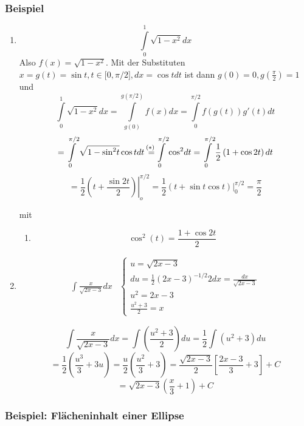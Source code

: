 \begin{enumerate}
\subsubsection*{Beispiel}
\begin{enumerate}
\item \[\int\limits_0^1 {\sqrt {1 - {x^2}} dx} \] Also $f(x)=\sqrt{1-x^2}$. Mit der Substituten $x=g(t)=\sin t, t\in \lbrack 0,\pi/2\rbrack, dx=\cos tdt$ ist dann $g(0)=0, g\left(\frac{\pi}{2}\right)=1$ und 
\[\int\limits_0^1 {\sqrt {1 - {x^2}} } dx = \int\limits_{g(0)}^{g(\pi /2)} {f(x)dx = \int\limits_0^{\pi /2} {f\left( {g(t)} \right)g'(t)dt} } \]
\[ = \int\limits_0^{\pi /2} {\sqrt {1 - {{\sin }^2}t} \cos tdt\mathop {{\rm{  }} = }\limits^{\text{(\textasteriskcentered )} }} \int\limits_0^{\pi /2} {{{\cos }^2}dt}  = \int\limits_0^{\pi /2} {\frac{1}{2}\left( {1 + \cos 2t} \right)dt} \]
\[ = \left. {\frac{1}{2}\left( {t + \frac{{\sin 2t}}{2}} \right)} \right|_o^{\pi /2} = \frac{1}{2}\left. {\left( {t + \sin t\cos t} \right)} \right|_0^{\pi /2} = \frac{\pi }{2}\]

mit \begin{enumerate}[(\textasteriskcentered )]
\item $${\cos ^2}(t) = \frac{{1 + \cos 2t}}{2}$$
\end{enumerate}

\item \[\begin{array}{*{20}{c}}
{\int {\frac{x}{{\sqrt {2x - 3} }}dx} }&{\left\{ {\begin{array}{*{20}{l}}
{u = \sqrt {2x - 3} }\\
{du = \frac{1}{2}{{\left( {2x - 3} \right)}^{ - 1/2}}2dx = \frac{{dx}}{{\sqrt {2x - 3} }}}\\
{{u^2} = 2x - 3}\\
{\frac{{{u^2} + 3}}{2} = x}
\end{array}} \right.}
\end{array}\]


\[\int {\frac{x}{{\sqrt {2x - 3} }}dx}  = \int {\left( {\frac{{{u^2} + 3}}{2}} \right)} du = \frac{1}{2}\int {({u^2} + 3)du} \]
\[ = \frac{1}{2}\left( {\frac{{{u^3}}}{3} + 3u} \right) = \frac{u}{2}\left( {\frac{{{u^2}}}{3} + 3} \right) = \frac{{\sqrt {2x - 3} }}{2}\left[ {\frac{{2x - 3}}{3} + 3} \right] + C\]
\[ = \sqrt {2x - 3} \left( {\frac{x}{3} + 1} \right) + C\]
\end{enumerate}
\subsubsection*{Beispiel: Flächeninhalt einer Ellipse}


\end{enumerate}
